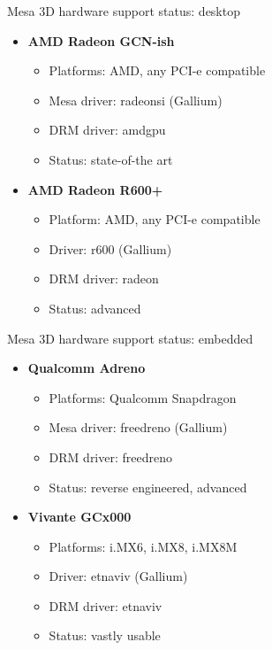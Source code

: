 \begin{frame}{Mesa 3D hardware support status: desktop}
  \begin{itemize}
  \item \textbf{AMD Radeon GCN-ish}
    \begin{itemize}
    \item Platforms: AMD, any PCI-e compatible
    \item Mesa driver: radeonsi (Gallium)
    \item DRM driver: amdgpu
    \item Status: state-of-the art
    \end{itemize}
  \item \textbf{AMD Radeon R600+}
    \begin{itemize}
    \item Platform: AMD, any PCI-e compatible
    \item Driver: r600 (Gallium)
    \item DRM driver: radeon
    \item Status: advanced
    \end{itemize}
  \end{itemize}
\end{frame}

\begin{frame}{Mesa 3D hardware support status: embedded}
  \begin{itemize}
  \item \textbf{Qualcomm Adreno}
    \begin{itemize}
    \item Platforms: Qualcomm Snapdragon
    \item Mesa driver: freedreno (Gallium)
    \item DRM driver: freedreno
    \item Status: reverse engineered, advanced
    \end{itemize}
  \item \textbf{Vivante GCx000}
    \begin{itemize}
    \item Platforms: i.MX6, i.MX8, i.MX8M
    \item Driver: etnaviv (Gallium)
    \item DRM driver: etnaviv
    \item Status: vastly usable
    \end{itemize}
  \end{itemize}
\end{frame}

